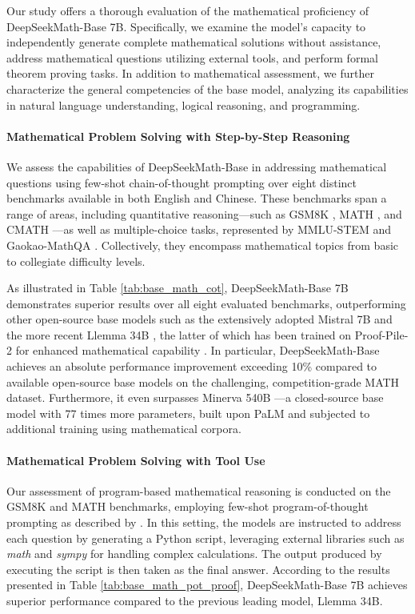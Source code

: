 \begin{itemize}[topsep=0pt]
Our study offers a thorough evaluation of the mathematical proficiency of DeepSeekMath-Base 7B. Specifically, we examine the model’s capacity to independently generate complete mathematical solutions without assistance, address mathematical questions utilizing external tools, and perform formal theorem proving tasks. In addition to mathematical assessment, we further characterize the general competencies of the base model, analyzing its capabilities in natural language understanding, logical reasoning, and programming.

\paragraph{Mathematical Problem Solving with Step-by-Step Reasoning}

We assess the capabilities of DeepSeekMath-Base in addressing mathematical questions using few-shot chain-of-thought prompting \citep{cot} over eight distinct benchmarks available in both English and Chinese. These benchmarks span a range of areas, including quantitative reasoning—such as GSM8K \citep{gsm8k}, MATH \citep{MATH}, and CMATH \citep{wei2023cmath}—as well as multiple-choice tasks, represented by MMLU-STEM \citep{mmlu} and Gaokao-MathQA \citep{agieval}. Collectively, they encompass mathematical topics from basic to collegiate difficulty levels.

As illustrated in Table \ref{tab:base_math_cot}, DeepSeekMath-Base 7B demonstrates superior results over all eight evaluated benchmarks, outperforming other open-source base models such as the extensively adopted Mistral 7B \citep{mistral} and the more recent Llemma 34B \citep{llemma}, the latter of which has been trained on Proof-Pile-2 for enhanced mathematical capability \citep{llemma}. In particular, DeepSeekMath-Base achieves an absolute performance improvement exceeding 10\% compared to available open-source base models on the challenging, competition-grade MATH dataset. Furthermore, it even surpasses Minerva 540B \citep{minerva}—a closed-source base model with 77 times more parameters, built upon PaLM \citep{palm} and subjected to additional training using mathematical corpora.

\paragraph{Mathematical Problem Solving with Tool Use} Our assessment of program-based mathematical reasoning is conducted on the GSM8K and MATH benchmarks, employing few-shot program-of-thought prompting as described by \citet{pot,pal}. In this setting, the models are instructed to address each question by generating a Python script, leveraging external libraries such as \textit{math} and \textit{sympy} for handling complex calculations. The output produced by executing the script is then taken as the final answer. According to the results presented in Table \ref{tab:base_math_pot_proof}, DeepSeekMath-Base 7B achieves superior performance compared to the previous leading model, Llemma 34B.


\end{itemize}
